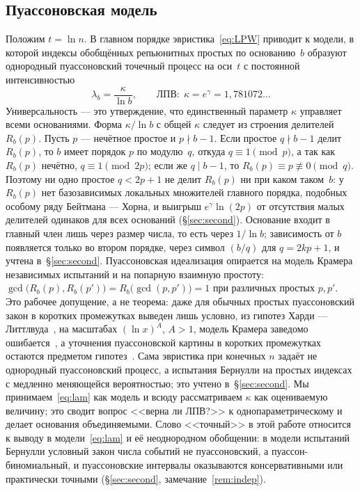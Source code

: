 \documentclass[11pt,a4paper]{article}
\theoremstyle{plain}
\theoremstyle{remark}
\newcommand{\Rb}{R_b}
\newcommand{\eg}{e^{\gamma}}
\begin{document}
\subsection{Пуассоновская модель}
Положим $t=\ln n$. В главном порядке эвристика~\eqref{eq:LPW} приводит к модели, в
которой индексы обобщённых репьюнитных простых по основанию~$b$ образуют однородный
пуассоновский точечный процесс на оси~$t$ с постоянной интенсивностью
\begin{equation}\label{eq:lam}
\lambda_b=\frac{\kappa}{\ln b},\qquad \text{ЛПВ:}\ \ \kappa=\eg=1{,}781072\ldots
\end{equation}
Универсальность --- это утверждение, что единственный параметр $\kappa$ управляет всеми
основаниями. Форма $\kappa/\ln b$ с общей $\kappa$ следует из строения делителей
$\Rb(p)$. Пусть $p$ --- нечётное простое и $p\nmid b-1$. Если простое $q\nmid b-1$
делит $\Rb(p)$, то $b$ имеет порядок $p$ по модулю~$q$, откуда $q\equiv1\pmod p$,
а так как $\Rb(p)$ нечётно, $q\equiv1\pmod{2p}$; если же $q\mid b-1$, то
$\Rb(p)\equiv p\not\equiv0\pmod q$. Поэтому ни одно простое $q<2p+1$ не делит
$\Rb(p)$ ни при каком таком~$b$: у $\Rb(p)$ нет базозависимых локальных множителей главного порядка,
подобных особому ряду Бейтмана --- Хорна, и выигрыш $\eg\ln(2p)$ от отсутствия малых
делителей одинаков для всех оснований (\S\ref{sec:second}). Основание входит в
главный член лишь через размер числа, то есть через $1/\ln b$; зависимость от $b$
появляется только во втором порядке, через символ $(b/q)$ для $q=2kp+1$, и учтена
в~\S\ref{sec:second}. Пуассоновская идеализация опирается на модель Крамера
независимых испытаний и на попарную взаимную простоту:
$\gcd\bigl(\Rb(p),\Rb(p')\bigr)=\Rb\bigl(\gcd(p,p')\bigr)=1$ при различных простых
$p,p'$. Это рабочее допущение, а не теорема: даже для обычных простых пуассоновский
закон в коротких промежутках выведен лишь условно, из гипотез Харди ---
Литтлвуда~\cite{gallagher1976}, на масштабах $(\ln x)^{A}$, $A>1$, модель Крамера
заведомо ошибается~\cite{maier1985}, а уточнения пуассоновской картины в коротких
промежутках остаются предметом гипотез~\cite{jha2026}. Сама эвристика при конечных
$n$ задаёт не однородный пуассоновский процесс, а испытания Бернулли на простых
индексах с медленно меняющейся вероятностью; это учтено в~\S\ref{sec:second}.
Мы принимаем~\eqref{eq:lam} как модель и всюду рассматриваем
$\kappa$ как оцениваемую величину; это сводит вопрос <<верна ли ЛПВ?>> к однопараметрическому и
делает основания объединяемыми. Слово <<точный>> в этой работе относится к выводу
в модели~\eqref{eq:lam} и её неоднородном обобщении: в модели испытаний Бернулли
условный закон числа событий не пуассоновский, а пуассон-биномиальный, и
пуассоновские интервалы оказываются консервативными или практически точными
(\S\ref{sec:second}, замечание~\ref{rem:indep}).
\end{document}
